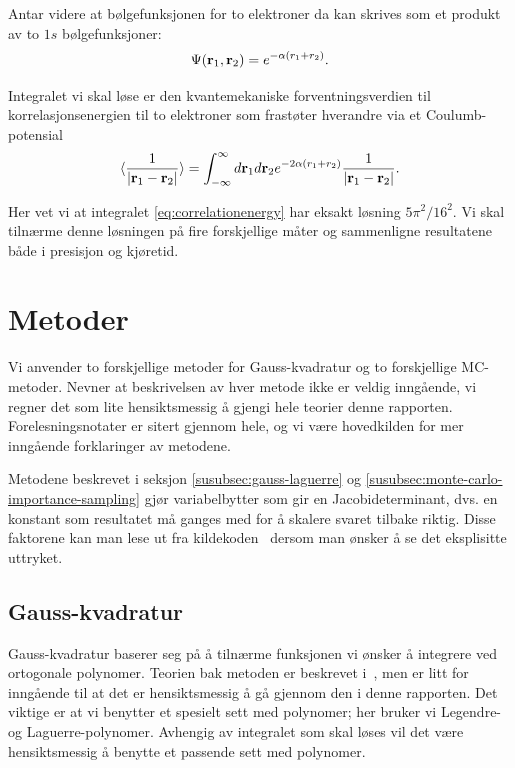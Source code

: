 \documentclass[11pt]{article}
\begin{document}
Antar videre at bølgefunksjonen for to elektroner da kan skrives som et produkt av
to $1s$ bølgefunksjoner:
\[
   \Psi({\bf r}_1,{\bf r}_2)  =   e^{-\alpha (r_1+r_2)}.
\]

Integralet vi skal løse er den kvantemekaniske forventningsverdien
til korrelasjonsenergien til to elektroner som frastøter hverandre via et Coulumb-potensial
\begin{equation}\label{eq:correlationenergy}
   \langle \frac{1}{|{\bf r}_1-{\bf r}_2|} \rangle =
   \int_{-\infty}^{\infty} d{\bf r}_1d{\bf r}_2  e^{-2\alpha (r_1+r_2)}\frac{1}{|{\bf r}_1-{\bf r}_2|}.
\end{equation}

Her vet vi at integralet \eqref{eq:correlationenergy} har eksakt løsning $5\pi^2/16^2$. Vi skal tilnærme denne 
løsningen på fire forskjellige måter og sammenligne resultatene både i presisjon og kjøretid.

\section{Metoder}
\label{sec:metoder}
Vi anvender to forskjellige metoder for Gauss-kvadratur og to
forskjellige MC-metoder. Nevner at beskrivelsen av hver metode ikke er
veldig inngående, vi regner det som lite hensiktsmessig å gjengi hele
teorier denne rapporten. Forelesningsnotater er sitert gjennom hele,
og vi være hovedkilden for mer inngående forklaringer av metodene.

Metodene beskrevet i seksjon \ref{susubsec:gauss-laguerre} og
\ref{susubsec:monte-carlo-importance-sampling} gjør variabelbytter som
gir en Jacobideterminant, dvs. en konstant som resultatet må ganges
med for å skalere svaret tilbake riktig. Disse faktorene kan man lese
ut fra kildekoden~\cite{github-repo} dersom man ønsker å se det
eksplisitte uttryket.

\subsection{Gauss-kvadratur}
\label{subsec:gauss-kvadratur}
Gauss-kvadratur baserer seg på å tilnærme funksjonen vi ønsker å
integrere ved ortogonale polynomer. Teorien bak metoden er beskrevet
i~\cite{Lecture-notes}, men er litt for inngående til at det er
hensiktsmessig å gå gjennom den i denne rapporten. Det viktige er at
vi benytter et spesielt sett med polynomer; her bruker vi Legendre- og
Laguerre-polynomer. Avhengig av integralet som skal løses vil det være
hensiktsmessig å benytte et passende sett med polynomer.
\end{document}
